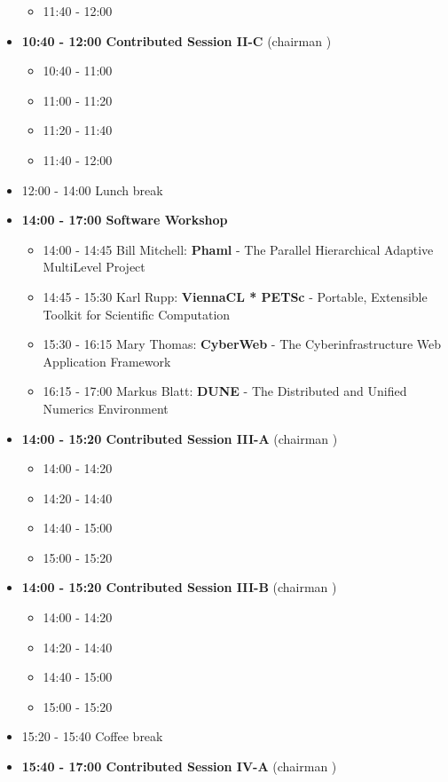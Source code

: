 \documentclass[10pt, A4]{article}%
\begin{document}
\begin{itemize}
\begin{itemize}
    \item 11:40 - 12:00  
  \end{itemize}
  \item {\bf 10:40 - 12:00 Contributed Session II-C} (chairman ) 
  \begin{itemize}
    \item 10:40 - 11:00
    \item 11:00 - 11:20 
    \item 11:20 - 11:40 
    \item 11:40 - 12:00 
  \end{itemize}
  \item 12:00 - 14:00 Lunch break
  \item {\bf 14:00 - 17:00 Software Workshop}
  \begin{itemize}
    \item 14:00 - 14:45 Bill Mitchell: {\bf Phaml} - The Parallel Hierarchical Adaptive MultiLevel Project
    \item 14:45 - 15:30 Karl Rupp: {\bf ViennaCL * PETSc} - Portable, Extensible Toolkit for
Scientific Computation
    \item 15:30 - 16:15 Mary Thomas: {\bf CyberWeb} - The Cyberinfrastructure Web Application Framework
    \item 16:15 - 17:00 Markus Blatt: {\bf DUNE} - The Distributed and Unified Numerics Environment
  \end{itemize}
  \item {\bf 14:00 - 15:20 Contributed Session III-A} (chairman ) 
  \begin{itemize}
    \item 14:00 - 14:20 
    \item 14:20 - 14:40 
    \item 14:40 - 15:00
    \item 15:00 - 15:20  
  \end{itemize}
  \item {\bf 14:00 - 15:20 Contributed Session III-B} (chairman ) 
  \begin{itemize}
    \item 14:00 - 14:20 
    \item 14:20 - 14:40 
    \item 14:40 - 15:00
    \item 15:00 - 15:20  
  \end{itemize}
  \item 15:20 - 15:40 Coffee break
  \item {\bf 15:40 - 17:00 Contributed Session IV-A} (chairman ) 

\end{itemize}
\end{document}
